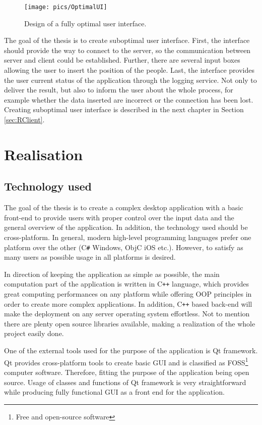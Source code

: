 \documentclass[thesis=M,english]{FITthesis}[2012/10/20]
\begin{document}
\begin{figure}[H]
\centering
\texttt{[image: pics/OptimalUI]}
\caption{Design of a fully optimal user interface.}
\label{fig:OptUI}
\end{figure}

The goal of the thesis is to create suboptimal user interface. First, the interface should provide the way to connect to the server, so the communication between server and client could be established. Further, there are several input boxes allowing the user to insert the position of the people. Last, the interface provides the user current status of the application through the logging service. Not only to deliver the result, but also to inform the user about the whole process, for example whether the data inserted are incorrect or the connection has been lost.
Creating suboptimal user interface is described in the next chapter in Section \ref{sec:RClient}.

\chapter{Realisation}
\label{ch:Realisation}

\section{Technology used}
\label{sec:TechUsed}
The goal of the thesis is to create a complex desktop application with a basic front-end to provide users with proper control over the input data and the general overview of the application. In addition, the technology used should be cross-platform. In general, modern high-level programming languages prefer one platform over the other (C\texttt{\#} Windows, ObjC iOS etc.). However, to satisfy as many users as possible usage in all platforms is desired.

In direction of keeping the application as simple as possible, the main computation part of the application is written in C\texttt{++} language, which provides great computing performances on any platform while offering OOP principles in order to create more complex applications. In addition, C\texttt{++} based back-end will make the deployment on any server operating system effortless. Not to mention there are plenty open source libraries available, making a realization of the whole project easily done.  

One of the external tools used for the purpose of the application is Qt framework. Qt provides cross-platform tools to create basic GUI and is classified as FOSS\footnote{Free and open-source software} computer software. Therefore, fitting the purpose of the application being open source. 
Usage of classes and functions of Qt framework is very straightforward while producing fully functional GUI as a front end for the application\cite{QT17}. 
\end{document}
